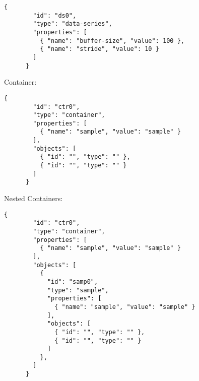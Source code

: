     \begin{lstlisting}[caption={Object Configuration in JSON},label={lst:cfg-json-obj}]
      {
        "id": "ds0",
        "type": "data-series",
        "properties": [
          { "name": "buffer-size", "value": 100 },
          { "name": "stride", "value": 10 }
        ]
      }
    \end{lstlisting}

    Container:

    \begin{lstlisting}[caption={Container Configuration in JSON},label={lst:cfg-json-ctr}]
      {
        "id": "ctr0",
        "type": "container",
        "properties": [
          { "name": "sample", "value": "sample" }
        ],
        "objects": [
          { "id": "", "type": "" },
          { "id": "", "type": "" }
        ]
      }
    \end{lstlisting}

    Nested Containers:

    \begin{lstlisting}[caption={Nested Container Configuration in JSON},label={lst:cfg-json-ctr}]
      {
        "id": "ctr0",
        "type": "container",
        "properties": [
          { "name": "sample", "value": "sample" }
        ],
        "objects": [
          {
            "id": "samp0",
            "type": "sample",
            "properties": [
              { "name": "sample", "value": "sample" }
            ],
            "objects": [
              { "id": "", "type": "" },
              { "id": "", "type": "" }
            ]
          },
        ]
      }
    \end{lstlisting}
